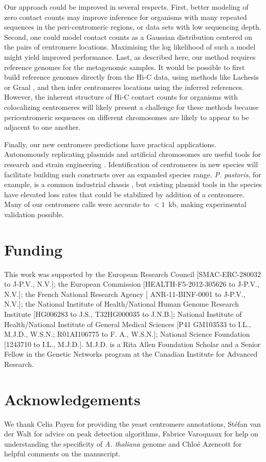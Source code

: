 Our approach could be improved in several respects. First, better
modeling of zero contact counts may improve inference for organisms
with many repeated sequences in the peri-centromeric regions, or data
sets with low sequencing depth. Second, one could model contact counts
as a Gaussian distribution centered on the pairs of centromere
locations. Maximising the log likelihood of such a model 
might yield improved performance.
Last, as described here, our method requires reference genomes for the
metagenomic samples. It would be possible to first build reference
genomes directly from the Hi-C data, using methods like Lachesis
\citep{burton:chromosome} or Graal \citep{marie-nelly:high-quality},
and then infer centromeres locations using the inferred
references. However, the inherent structure of Hi-C contact counts for
organisms with colocalizing centromeres will likely present a
challenge for these methods because pericentromeric sequences on
different chromosomes are likely to appear to be adjacent to one
another.

Finally, our new centromere predictions have practical applications.
Autonomously replicating plasmids and artificial chromosomes are useful tools
for research and strain engineering \citep{boer:yeast}. Identification of
centromeres in new species will facilitate building such constructs over an
expanded species range. \textit{P. pastoris}, for example, is a common
industrial chassis \citep{cregg:expression}, but existing plasmid tools in the
species have elevated loss rates \citep{liachko:autonomously} that could be
stabilized by addition of a centromere. Many of our centromere calls were
accurate to $<1$~kb, making experimental validation possible.

\section{Funding}

This work was supported by the European Research Council [SMAC-ERC-280032 to
J-P.V., N.V.]; the European Commission [HEALTH-F5-2012-305626 to J-P.V.,
N.V.]; the French National Research Agency [ ANR-11-BINF-0001 to J-P.V.,
N.V.]; the National Institute of Health/National Human Genome Research
Institute [HG006283 to J.S., T32HG000035 to J.N.B.];
National Institute of Health/National Institute of General Medical Sciences [P41 GM103533 to I.L.,
M.J.D., W.S.N.; R01AI106775 to F. A., W.S.N.]; National Science Foundation
[1243710 to I.L., M.J.D.]. M.J.D. is a Rita Allen Foundation Scholar and a Senior
Fellow in the Genetic Networks program at the Canadian Institute for Advanced
Research.

\section{Acknowledgements}

We thank Celia Payen for providing the yeast centromere annotations,
St\'{e}fan van der Walt for advice on peak detection algorithms, Fabrice
Varoquaux for help on understanding the specificity of \textit{A. thaliana}
genome
and Chlo\'{e}
Azencott for helpful comments on the manuscript.


